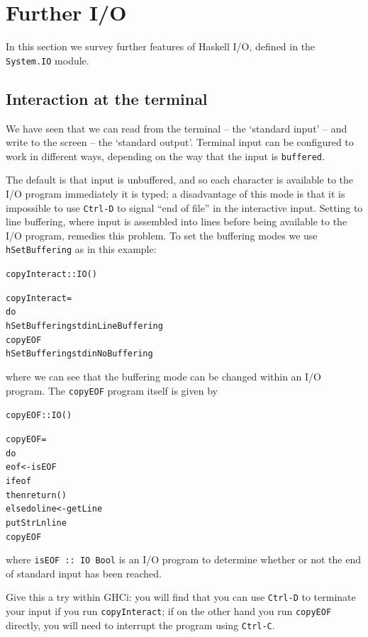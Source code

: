 \section{Further I/O}
\label{furtherIO}

In this section we survey further features of Haskell I/O, defined in the \texttt{System.IO} module.

\subsection*{Interaction at the terminal}

We have seen that we can read from the terminal -- the `standard input' -- and write to
the screen -- the `standard output'. Terminal input can be configured to work in different ways, depending on the way that the input is \texttt{buffered}. 

The default is that input is unbuffered, and so each character is available to the I/O program immediately it is typed; a disadvantage of this mode is that it is impossible to use \texttt{Ctrl-D} to signal ``end of file'' in the interactive input. Setting to line buffering, where input is assembled into lines before being available to the I/O program, remedies this problem. To set the buffering modes we use \texttt{hSetBuffering} as in this example:
\begin{alltt}
copyInteract :: IO ()

copyInteract = 
    do
      hSetBuffering stdin LineBuffering
      copyEOF
      hSetBuffering stdin NoBuffering
\end{alltt}
where we can see that the buffering mode can be changed within an I/O program. The \texttt{copyEOF} program itself is given by 
\begin{alltt}
copyEOF :: IO ()

copyEOF = 
    do 
      eof <- isEOF
      if eof  
        then return () 
        else do line <- getLine 
                putStrLn line
                copyEOF
\end{alltt}
where \texttt{isEOF ::\ IO Bool} is an I/O program to determine whether or not the end of standard input has been reached. 

Give this a try within GHCi: you will find that you can use \texttt{Ctrl-D} to terminate your input if you run \texttt{copyInteract}; if on the other hand you run \texttt{copyEOF} directly, you will need to interrupt the program using \texttt{Ctrl-C}.

